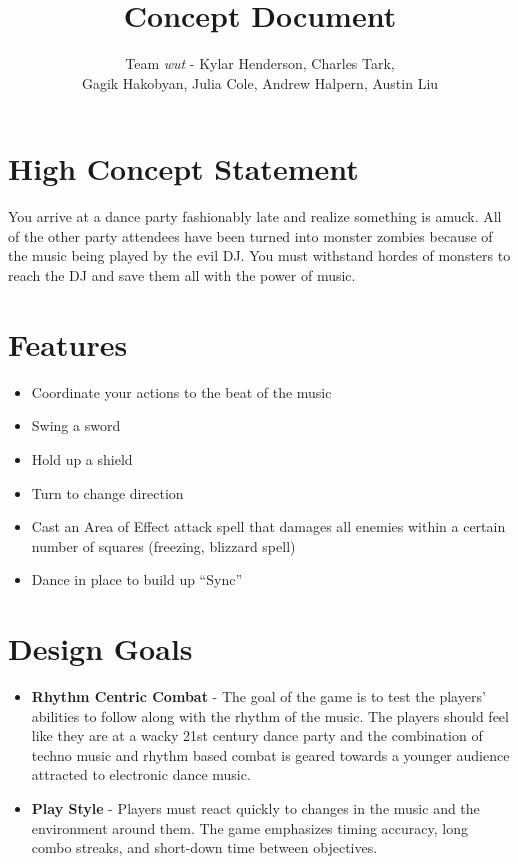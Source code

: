 \documentclass[]{article}
\begin{document}
\title{Concept Document}
\author{Team \emph{wut} - Kylar Henderson, Charles Tark,\\ 
Gagik Hakobyan, Julia Cole, Andrew Halpern, Austin Liu}
\date{} %
\maketitle

\section*{High Concept Statement}
You arrive at a dance party fashionably late and realize something is
amuck. All of the other party attendees have been turned into monster
zombies because of the music being played by the evil DJ. You must
withstand hordes of monsters to reach the DJ and save them all with
the power of music.

\section*{Features}
\begin{itemize}
\item 
  Coordinate your actions to the beat of the music
\item 
  Swing a sword
\item 
  Hold up a shield
\item 
  Turn to change direction
\item 
  Cast an Area of Effect attack spell that damages all 
  enemies within a certain number of squares (freezing, blizzard spell)
\item 
  Dance in place to build up ``Sync''
\end{itemize}

\section*{Design Goals}
\begin{itemize}
\item
  \textbf{Rhythm Centric Combat} - The goal of the game is to test the
  players' abilities to follow along with the rhythm of the music. The
  players should feel like they are at a wacky 21st century dance party
  and the combination of techno music and rhythm based combat is geared
  towards a younger audience attracted to electronic dance music.
\item
  \textbf{Play Style} - Players must react quickly to changes in the
  music and the environment around them. The game emphasizes timing
  accuracy, long combo streaks, and short-down time between objectives.
\end{itemize}
\end{document}
